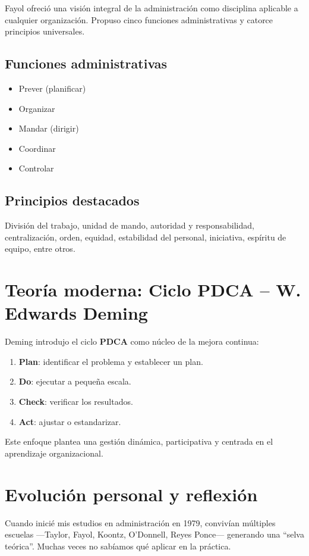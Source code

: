 \documentclass[a4paper,12pt]{article}
\begin{document}
	Fayol ofreció una visión integral de la administración como disciplina aplicable a cualquier organización. Propuso cinco funciones administrativas y catorce principios universales.
	
	\subsection*{Funciones administrativas}
	\begin{itemize}
		\item Prever (planificar)
		\item Organizar
		\item Mandar (dirigir)
		\item Coordinar
		\item Controlar
	\end{itemize}
	
	\subsection*{Principios destacados}
	División del trabajo, unidad de mando, autoridad y responsabilidad, centralización, orden, equidad, estabilidad del personal, iniciativa, espíritu de equipo, entre otros.
	
	\section{Teoría moderna: Ciclo PDCA – W. Edwards Deming}
	
	Deming introdujo el ciclo \textbf{PDCA} como núcleo de la mejora continua:
	
	\begin{enumerate}
		\item \textbf{Plan}: identificar el problema y establecer un plan.
		\item \textbf{Do}: ejecutar a pequeña escala.
		\item \textbf{Check}: verificar los resultados.
		\item \textbf{Act}: ajustar o estandarizar.
	\end{enumerate}
	
	Este enfoque plantea una gestión dinámica, participativa y centrada en el aprendizaje organizacional.
	
	\section{Evolución personal y reflexión}
	
	Cuando inicié mis estudios en administración en 1979, convivían múltiples escuelas —Taylor, Fayol, Koontz, O'Donnell, Reyes Ponce— generando una “selva teórica”. Muchas veces no sabíamos qué aplicar en la práctica.
	
\end{document}
